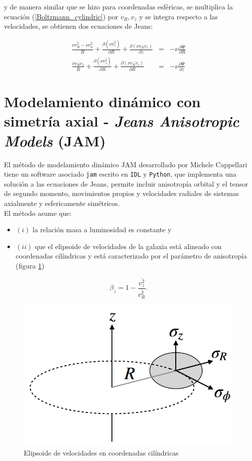 y de manera similar que se hizo para coordenadas esféricas, se multiplica la ecuación (\ref{Boltzmann_cylindric}) por $v_R, v_z$ y se integra respecto a las velocidades, se obtienen dos ecuaciones de Jeans:

\begin{eqnarray}
\label{Jeans_eq_cylindric}
\frac{ \nu \overline{v_R^2} - \nu \overline{v_{\phi}^2} }{R } + \frac{\partial (\nu \overline{v_z^2})}{\partial R} + \frac{\partial (\nu \overline{v_R v_z}) }{\partial z} &=& -\nu \frac{\partial \Psi}{\partial R} \\
\frac{ \nu \overline{v_R v_z}  }{R } + \frac{\partial (\nu \overline{v_z^2})}{\partial R} + \frac{\partial (\nu \overline{v_R v_z}) }{\partial R} &=& -\nu \frac{\partial \Psi}{\partial z}
\end{eqnarray}

\section{Modelamiento dinámico con simetría axial - \emph{Jeans Anisotropic Models} (JAM)}

El método de modelamiento dinámico JAM desarrollado por Michele Cappellari \cite{2008MNRAS.390_71C} tiene un software asociado \verb+jam+ escrito en \verb+IDL+ y \verb+Python+, que implementa una solución a las ecuaciones de Jeans, permite incluir anisotropía orbital y el tensor de segundo momento,  movimientos propios y velocidades radiales de sistemas axialmente y esfericamente simétricos.\\ 

El método asume que:
\begin{itemize}
\item $(i)$ la relación masa a luminosidad es constante y 
\item $(ii)$  que el elipsoide de velocidades de la galaxia está alineado con coordenadas cilíndricas y está caracterizado por el parámetro de anisotropía (figura \ref{fig:Ellipsoid})
\end{itemize}
$$ \beta_z = 1-\frac{\overline{v_z^2}}{ \overline{v_R^2} }. $$

\begin{figure}
  \centering
    \includegraphics[width=0.8\columnwidth]{Kap2/ellipsoid.png}
  \caption{Elipsoide de velocidades en coordenadas cilíndricas}
  \label{fig:Ellipsoid}
\end{figure}


